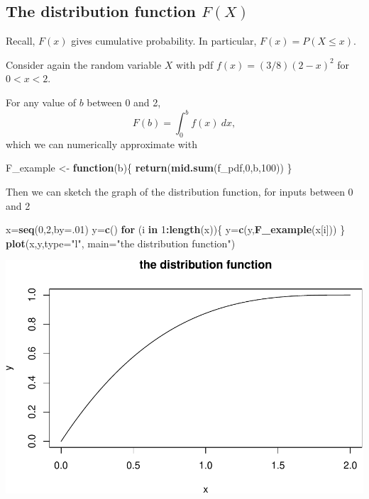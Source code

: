 \documentclass[
]{book}
\newenvironment{Shaded}{\begin{snugshade}}{\end{snugshade}}
\newcommand{\AttributeTok}[1]{\textcolor[rgb]{0.13,0.29,0.53}{#1}}
\newcommand{\ControlFlowTok}[1]{\textcolor[rgb]{0.13,0.29,0.53}{\textbf{#1}}}
\newcommand{\DecValTok}[1]{\textcolor[rgb]{0.00,0.00,0.81}{#1}}
\newcommand{\FunctionTok}[1]{\textcolor[rgb]{0.13,0.29,0.53}{\textbf{#1}}}
\newcommand{\NormalTok}[1]{#1}
\newcommand{\OtherTok}[1]{\textcolor[rgb]{0.56,0.35,0.01}{#1}}
\newcommand{\SpecialCharTok}[1]{\textcolor[rgb]{0.81,0.36,0.00}{\textbf{#1}}}
\newcommand{\StringTok}[1]{\textcolor[rgb]{0.31,0.60,0.02}{#1}}
\theoremstyle{definition}
\theoremstyle{definition}
\theoremstyle{definition}
\theoremstyle{definition}
\theoremstyle{remark}
\begin{document}
\subsection*{\texorpdfstring{The distribution function \(F(X)\)}{The distribution function F(X)}}\label{the-distribution-function-fx}

Recall, \(F(x)\) gives cumulative probability. In particular, \(F(x) = P(X \leq x)\).

Consider again the random variable \(X\) with pdf \(f(x) = (3/8)(2-x)^2\) for \(0 < x < 2\).

For any value of \(b\) between 0 and 2, \[F(b) = \int_0^b f(x)~dx,\]
which we can numerically approximate with

\begin{Shaded}
\begin{Highlighting}[]
\NormalTok{F\_example }\OtherTok{\textless{}{-}} \ControlFlowTok{function}\NormalTok{(b)\{}
  \FunctionTok{return}\NormalTok{(}\FunctionTok{mid.sum}\NormalTok{(f\_pdf,}\DecValTok{0}\NormalTok{,b,}\DecValTok{100}\NormalTok{))}
\NormalTok{\}}
\end{Highlighting}
\end{Shaded}

Then we can sketch the graph of the distribution function, for inputs between 0 and 2

\begin{Shaded}
\begin{Highlighting}[]
\NormalTok{x}\OtherTok{=}\FunctionTok{seq}\NormalTok{(}\DecValTok{0}\NormalTok{,}\DecValTok{2}\NormalTok{,}\AttributeTok{by=}\NormalTok{.}\DecValTok{01}\NormalTok{)}
\NormalTok{y}\OtherTok{=}\FunctionTok{c}\NormalTok{()}
\ControlFlowTok{for}\NormalTok{ (i }\ControlFlowTok{in} \DecValTok{1}\SpecialCharTok{:}\FunctionTok{length}\NormalTok{(x))\{}
\NormalTok{  y}\OtherTok{=}\FunctionTok{c}\NormalTok{(y,}\FunctionTok{F\_example}\NormalTok{(x[i]))}
\NormalTok{\}}
\FunctionTok{plot}\NormalTok{(x,y,}\AttributeTok{type=}\StringTok{"l"}\NormalTok{,}
     \AttributeTok{main=}\StringTok{"the distribution function"}\NormalTok{)}
\end{Highlighting}
\end{Shaded}

\includegraphics{math340-notes_files/figure-latex/plot distn fcn-1.pdf}
\end{document}
